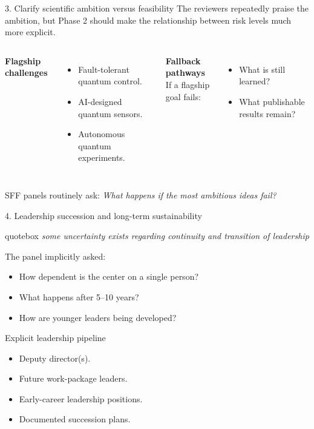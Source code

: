 \documentclass[10pt,aspectratio=169]{beamer}
\newcommand{\reviewerquote}[1]{%
  \begin{beamercolorbox}[sep=6pt,rounded=true,shadow=true]{quotebox}%
  \itshape #1%
  \end{beamercolorbox}%
}
\begin{document}
\begin{frame}{3. Clarify scientific ambition versus feasibility}
  The reviewers repeatedly praise the ambition, but Phase 2 should make the relationship
  between risk levels much more explicit.
  \vfill
  \begin{columns}[T]
    \textbf{Flagship challenges}
    \begin{itemize}
      \item Fault-tolerant quantum control.
      \item AI-designed quantum sensors.
      \item Autonomous quantum experiments.
    \end{itemize}

    \textbf{Fallback pathways}\\
    If a flagship goal fails:
    \begin{itemize}
      \item What is still learned?
      \item What publishable results remain?
    \end{itemize}
  \end{columns}
  \vfill
  \begin{center}
    SFF panels routinely ask: \emph{What happens if the most ambitious ideas fail?}
  \end{center}
\end{frame}

\begin{frame}{4. Leadership succession and long-term sustainability}
  \reviewerquote{some uncertainty exists regarding continuity and transition of leadership}
  \vfill
  The panel implicitly asked:
  \begin{itemize}
    \item How dependent is the center on a single person?
    \item What happens after 5--10 years?
    \item How are younger leaders being developed?
  \end{itemize}
  \vfill
  \begin{block}{Explicit leadership pipeline}
    \begin{itemize}
      \item Deputy director(s).
      \item Future work-package leaders.
      \item Early-career leadership positions.
      \item Documented succession plans.
    \end{itemize}
  \end{block}
\end{frame}
\end{document}
